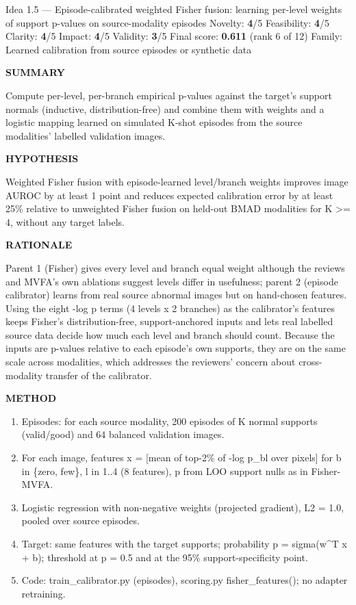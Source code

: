 \documentclass[11pt,a4paper]{article}
\newcommand{\lbl}[1]{{\sffamily\footnotesize\bfseries\color{muted}\MakeUppercase{#1}}\par}
\begin{document}
\begin{ideabox}{Idea 1.5 — Episode-calibrated weighted Fisher fusion: learning per-level weights of support p-values on source-modality episodes}
{\small Novelty: \textbf{4}/5 \quad Feasibility: \textbf{4}/5 \quad Clarity: \textbf{4}/5 \quad Impact: \textbf{4}/5 \quad Validity: \textbf{3}/5 \quad Final score: \textbf{0.611} (rank 6 of 12) \quad Family: Learned calibration from source episodes or synthetic data}\par\smallskip
\lbl{Summary}Compute per-level, per-branch empirical p-values against the target's support normals (inductive, distribution-free) and combine them with weights and a logistic mapping learned on simulated K-shot episodes from the source modalities' labelled validation images.

\lbl{Hypothesis}Weighted Fisher fusion with episode-learned level/branch weights improves image AUROC by at least 1 point and reduces expected calibration error by at least 25\% relative to unweighted Fisher fusion on held-out BMAD modalities for K \textgreater{}= 4, without any target labels.

\lbl{Rationale}Parent 1 (Fisher) gives every level and branch equal weight although the reviews and MVFA's own ablations suggest levels differ in usefulness; parent 2 (episode calibrator) learns from real source abnormal images but on hand-chosen features. Using the eight -log p terms (4 levels x 2 branches) as the calibrator's features keeps Fisher's distribution-free, support-anchored inputs and lets real labelled source data decide how much each level and branch should count. Because the inputs are p-values relative to each episode's own supports, they are on the same scale across modalities, which addresses the reviewers' concern about cross-modality transfer of the calibrator.

\lbl{Method}\begin{enumerate}[leftmargin=1.6em,itemsep=1pt,topsep=2pt]
\item Episodes: for each source modality, 200 episodes of K normal supports (valid/good) and 64 balanced validation images.
\item For each image, features x = [mean of top-2\% of -log p\_\allowbreak{}bl over pixels] for b in \{zero, few\}, l in 1..4 (8 features), p from LOO support nulls as in Fisher-MVFA.
\item Logistic regression with non-negative weights (projected gradient), L2 = 1.0, pooled over source episodes.
\item Target: same features with the target supports; probability p = sigma(w\textasciicircum{}T x + b); threshold at p = 0.5 and at the 95\% support-specificity point.
\item Code: train\_\allowbreak{}calibrator.py (episodes), scoring.py fisher\_\allowbreak{}features(); no adapter retraining.
\end{enumerate}


\end{ideabox}
\end{document}
